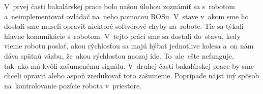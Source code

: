 V~prvej časti bakalárskej prace bolo našou úlohou zoznámiť sa s~robotom a~neimplementovať ovládač na~neho pomocou ROSu.
V~stave v~akom sme ho dostali sme museli opraviť niektoré softvérové chyby na~robote. Tie sa týkali hlavne komunikácie s~robotom.
V~tejto práci sme sa dostali do~stavu, kedy vieme robotu poslať, akou rýchlosťou sa majú hýbať jednotlive kolesa a~on nám dáva spätnú väzbu,
že~akou rýchlosťou naozaj ide. To~ale~ešte nefunguje, tak~ako má kvôli zašumenému signálu. V~druhej časti bakalárskej prace by sme chceli opraviť
alebo aspoň zredukovať toto zašumenie. Poprípade nájsť iný spôsob na~kontrolovanie pozície robota v~priestore.

